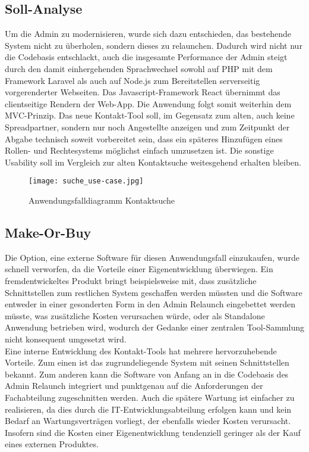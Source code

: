 \subsection{Soll-Analyse}
    Um die Admin zu modernisieren, wurde sich dazu entschieden, das bestehende System nicht zu überholen, sondern dieses zu relaunchen. Dadurch wird nicht nur die Codebasis entschlackt, auch die insgesamte Performance der Admin steigt durch den damit einhergehenden Sprachwechsel sowohl auf PHP mit dem Framework \glqq Laravel\grqq{} als auch auf Node.js zum Bereitstellen serverseitig vorgerenderter Webseiten. Das Javascript-Framework \glqq React\grqq{} übernimmt das clientseitige Rendern der Web-App. Die Anwendung folgt somit weiterhin dem MVC-Prinzip.\pagebreak
    Das neue Kontakt-Tool soll, im Gegensatz zum alten, auch keine Spreadpartner, sondern nur noch Angestellte anzeigen und zum Zeitpunkt der Abgabe technisch soweit vorbereitet sein, dass ein späteres Hinzufügen eines Rollen- und Rechtesystems möglichst einfach umzusetzen ist. Die sonstige Usability soll im Vergleich zur alten Kontaktsuche weitesgehend erhalten bleiben.

    \begin{figure}[h]
        \centering
        \texttt{[image: suche\_use-case.jpg]}
        \caption{Anwendungsfalldiagramm \glqq Kontaktsuche\grqq{}}
    \end{figure}

\subsection{Make-Or-Buy}
    Die Option, eine externe Software für diesen Anwendungsfall einzukaufen, wurde schnell verworfen, da die Vorteile einer Eigenentwicklung überwiegen. Ein fremdentwickeltes Produkt bringt beispielsweise mit, dass zusätzliche Schnittstellen zum restlichen System geschaffen werden müssten und die Software entweder in einer gesonderten Form in den Admin Relaunch eingebettet werden müsste, was zusätzliche Kosten verursachen würde, oder als Standalone Anwendung betrieben wird, wodurch der Gedanke einer zentralen Tool-Sammlung nicht konsequent umgesetzt wird.\\
    Eine interne Entwicklung des Kontakt-Tools hat mehrere hervorzuhebende Vorteile. Zum einen ist das zugrundeliegende System mit seinen Schnittstellen bekannt. Zum anderen kann die Software von Anfang an in die Codebasis des Admin Relaunch integriert und punktgenau auf die Anforderungen der Fachabteilung zugeschnitten werden. Auch die spätere Wartung ist einfacher zu realisieren, da dies durch die IT-Entwicklungsabteilung erfolgen kann und kein Bedarf an Wartungsverträgen vorliegt, der ebenfalls wieder Kosten verursacht. Insofern sind die Kosten einer Eigenentwicklung tendenziell geringer als der Kauf eines externen Produktes.

